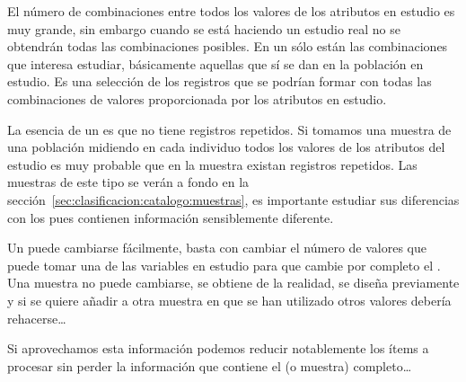El número de combinaciones entre todos los valores de los atributos en estudio es muy grande, sin embargo cuando se está haciendo un estudio real no se obtendrán todas las combinaciones posibles. En un \catalogo sólo están las combinaciones que interesa estudiar, básicamente aquellas que sí se dan en la población en estudio. Es una selección de los registros que se podrían formar con todas las combinaciones de valores proporcionada por los atributos en estudio.

La esencia de un \catalogo es que no tiene registros repetidos. Si tomamos una muestra de una población midiendo en cada individuo todos los valores de los atributos del estudio es muy probable que en la muestra existan registros repetidos. Las muestras de este tipo se verán a fondo en la sección~\ref{sec:clasificacion:catalogo:muestras}, es importante estudiar sus diferencias con los \catalogos pues contienen información sensiblemente diferente.

Un \catalogo puede cambiarse fácilmente, basta con cambiar el número de valores que puede tomar una de las variables en estudio para que cambie por completo el \catalogo. Una muestra no puede cambiarse, se obtiene de la realidad, se diseña previamente y si se quiere añadir a otra muestra en que se han utilizado otros valores debería rehacerse\ldots


Si aprovechamos esta información podemos reducir notablemente los ítems a procesar sin perder la información que contiene el \catalogo (o muestra) completo\ldots








%
%
%
%
%
%
%
%
%
%
%
%










